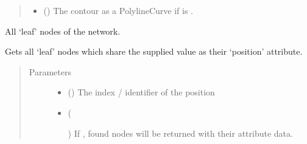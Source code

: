 \documentclass[letterpaper,10pt,english]{sphinxmanual}
\begin{document}
\begin{fulllineitems}
\begin{fulllineitems}
\begin{quote}
\begin{description}
\begin{itemize}
\item {} 
 () \textendash{} The contour as a PolylineCurve if  is .

\end{itemize}


\end{description}\end{quote}

\end{fulllineitems}


\begin{fulllineitems}
\label{\detokenize{cockatoo:cockatoo.KnitNetworkBase.leaf_nodes}}
All ‘leaf’ nodes of the network.

\end{fulllineitems}


\begin{fulllineitems}
\label{\detokenize{cockatoo:cockatoo.KnitNetworkBase.leaves_on_position}}
Gets all ‘leaf’ nodes which share the supplied value as their
‘position’ attribute.
\begin{quote}\begin{description}
\item[{Parameters}] \leavevmode\begin{itemize}
\item {} 
 () \textendash{} The index / identifier of the position

\item {} 
 (%
\begin{footnote}[88]\sphinxAtStartFootnote
{}
%
\end{footnote}\sphinxstyleliteralemphasis{\sphinxupquote{, }}) \textendash{} 
If , found nodes will be returned with their attribute
data.


\end{itemize}
\end{description}
\end{quote}
\end{fulllineitems}
\end{fulllineitems}
\end{document}
